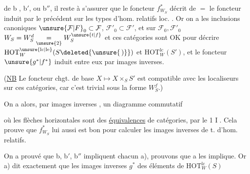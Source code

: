 
de b , b$'$, ou b$''$, il reste à s'assurer que le foncteur $f^*_{W_S}$ décrit de $=$ le foncteur induit par le précédent sur les types d'hom. relatifs loc. . Or on a les inclusions canoniques $\unsure{\mathcal F|F}_0\subset\mathcal F$, $\mathcal F'_0\subset\mathcal F'$, et sur $\mathcal F_0,\mathcal F'_0$ $W_S=W_S^d\underset{\unsure{2}}=W_S^{\unsure{t|f}}$ et ces  catégories sont OK pour  décrire $\mathrm{HOT}^{\unsure{\mathrm{lc}|\mathrm{le}}}_{W}(S\deleted{\unsure{\,) }})$ et $\mathrm{HOT}^{\mathrm{lc}}_W(S')$, et le foncteur $\unsure{g^*|f^*}$ induit entre eux par images inverses.


(\uline{NB} Le foncteur chgt. de base $X\mapsto X\times_S S'$ est compatible avec les localiseurs sur ces catégories, car c'est trivial sous la forme $W_S^f$.)

On a alors, par images inverses , un diagramme commutatif


où les flèches horizontales sont des \uline{équivalences} de catégories, par le  1 \textcircled{I}. Cela prouve que $f^*_{W_S}$ lui aussi est bon pour calculer les images inverses de t. d'hom. relatifs.

 On a prouvé que  b, b$'$, b$''$ impliquent chacun a), prouvons que a les implique. Or a) dit exactement que les images inverses  $g^*$ des éléments de $\mathrm{HOT}^{\mathrm{lc}}_W(S)$
